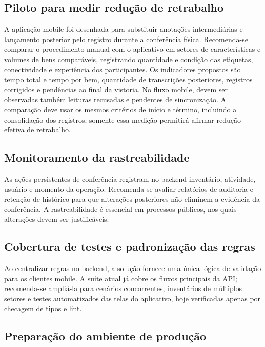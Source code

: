 \documentclass[12pt,a4paper]{article}
\begin{document}
\subsection{Piloto para medir redução de retrabalho}

A aplicação mobile foi desenhada para substituir anotações intermediárias e lançamento posterior pelo registro durante a conferência física. Recomenda-se comparar o procedimento manual com o aplicativo em setores de características e volumes de bens comparáveis, registrando quantidade e condição das etiquetas, conectividade e experiência dos participantes. Os indicadores propostos são tempo total e tempo por bem, quantidade de transcrições posteriores, registros corrigidos e pendências ao final da vistoria. No fluxo mobile, devem ser observadas também leituras recusadas e pendentes de sincronização. A comparação deve usar os mesmos critérios de início e término, incluindo a consolidação dos registros; somente essa medição permitirá afirmar redução efetiva de retrabalho.

\subsection{Monitoramento da rastreabilidade}

As ações persistentes de conferência registram no backend inventário, atividade, usuário e momento da operação. Recomenda-se avaliar relatórios de auditoria e retenção de histórico para que alterações posteriores não eliminem a evidência da conferência. A rastreabilidade é essencial em processos públicos, nos quais alterações devem ser justificáveis.

\subsection{Cobertura de testes e padronização das regras}

Ao centralizar regras no backend, a solução fornece uma única lógica de validação para os clientes mobile. A suíte atual já cobre os fluxos principais da API; recomenda-se ampliá-la para cenários concorrentes, inventários de múltiplos setores e testes automatizados das telas do aplicativo, hoje verificadas apenas por checagem de tipos e lint.

\subsection{Preparação do ambiente de produção}
\end{document}
